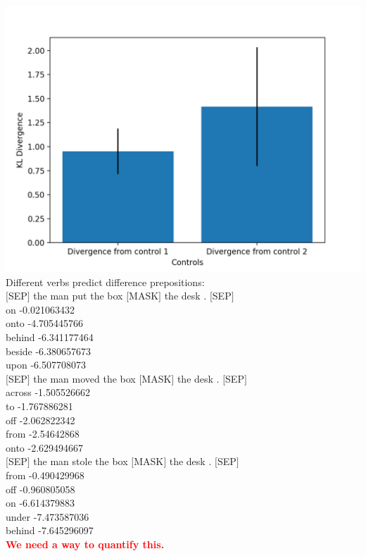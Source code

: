 \documentclass[twocolumn,dvipdfmx, 10pt]{article}
\begin{document}
\includegraphics[keepaspectratio,width = \linewidth]{const_divergence.png}
Different verbs predict difference prepositions:\\
$[$SEP$]$ the man put the box $[$MASK$]$ the desk . $[$SEP$]$\\	
on	-0.021063432\\
onto	-4.705445766\\
behind	-6.341177464\\
beside	-6.380657673\\
upon	-6.507708073\\
$[$SEP$]$ the man moved the box $[$MASK$]$ the desk . $[$SEP$]$\\	
across	-1.505526662\\
to	-1.767886281\\
off	-2.062822342\\
from	-2.54642868\\
onto	-2.629494667\\
$[$SEP$]$ the man stole the box $[$MASK$]$ the desk . $[$SEP$]$\\	
from	-0.490429968\\
off	-0.960805058\\
on	-6.614379883\\
under	-7.473587036\\
behind	-7.645296097\\
\textcolor{red}{\textbf{We need a way to quantify this.}}
\end{document}
